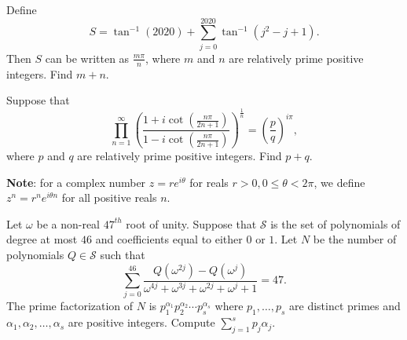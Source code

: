\documentclass[11pt]{article}
\theoremstyle{definition}
\begin{document}
%	



\begin{question}[name={2020-21 CHMMC Winter, Individual Round, \href{https://artofproblemsolving.com/community/c126h2426227p20001907}{Problem 8}}]
	Define
	\[
	S = \tan^{-1}(2020) + \sum_{j = 0}^{2020} \tan^{-1}(j^2 - j + 1).
	\]Then $S$ can be written as $\frac{m \pi}{n}$, where $m$ and $n$ are relatively prime positive integers. Find $m + n$.
\end{question}




%	


\begin{question}[name={2020-21 CHMMC Winter, Team Round, \href{https://artofproblemsolving.com/community/c126h2426256p20002117}{Problem 6}}]
	Suppose that
	\[
	\prod_{n=1}^{\infty}\left(\frac{1+i\cot\left(\frac{n\pi}{2n+1}\right)}{1-i\cot\left(\frac{n\pi}{2n+1}\right)}\right)^{\frac{1}{n}} = \left(\frac{p}{q}\right)^{i \pi},
	\]where $p$ and $q$ are relatively prime positive integers. Find $p+q$.
	
	\textbf{Note}: for a complex number $z = re^{i \theta}$ for reals $r > 0, 0 \le \theta < 2\pi$, we define $z^{n} = r^{n} e^{i \theta n}$ for all positive reals $n$.
\end{question}




%	



\begin{question}[name={2020-21 CHMMC Winter, Team Round, \href{https://artofproblemsolving.com/community/c126h2426264p20002195}{Problem 10}}]
	Let $\omega$ be a non-real $47^{th}$ root of unity. Suppose that $\mathcal{S}$ is the set of polynomials of degree at most $46$ and coefficients equal to either $0$ or $1$. Let $N$ be the number of polynomials $Q \in \mathcal{S}$ such that
	\[
	\sum_{j = 0}^{46} \frac{Q(\omega^{2j}) - Q(\omega^{j})}{\omega^{4j} + \omega^{3j} + \omega^{2j} + \omega^j + 1} =  47.
	\]The prime factorization of $N$ is $p_1^{\alpha_1}p_2^{\alpha_2} \cdots p_s^{\alpha_s}$ where $p_1, \ldots, p_s$ are distinct primes and $\alpha_1, \alpha_2, \ldots, \alpha_s$ are positive integers. Compute $\sum_{j = 1}^s p_j\alpha_j$.
\end{question}
\end{document}
